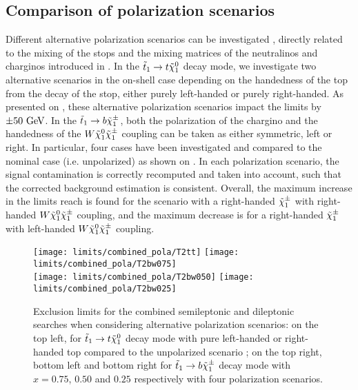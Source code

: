     \subsection{Comparison of polarization scenarios}

    Different alternative polarization scenarios can be investigated \cite{polarization1, polarization2}, directly related to the mixing of
    the stops and the mixing matrices of the neutralinos and charginos introduced in
    . In the
    $\tilde{t}_1 \rightarrow t \tilde{\chi}_1^0$ decay mode, we investigate two alternative scenarios
    in the on-shell case depending on the handedness of the top from the decay of the stop,
    either purely left-handed or purely right-handed. As presented on
    , these
    alternative polarization scenarios impact the limits by $\pm 50~\text{GeV}$. In the
    $\tilde{t}_1 \rightarrow b \tilde{\chi}_1^\pm$, both the polarization of the chargino and the
    handedness of the $W\tilde{\chi}_1^0\tilde{\chi}_1^\pm$ coupling can be taken as either symmetric,
    left or right. In particular, four cases have been investigated and compared to the
    nominal case (i.e. unpolarized) as shown on .
    In each polarization scenario, the signal contamination is correctly recomputed
    and taken into account, such that the corrected background estimation is consistent. Overall, the
    maximum increase in the limits reach is found for the scenario with a right-handed
    $\tilde{\chi}_1^\pm$ with right-handed $W\tilde{\chi}_1^0\tilde{\chi}_1^\pm$ coupling, and the maximum
    decrease is for a right-handed $\tilde{\chi}_1^\pm$ with left-handed $W\tilde{\chi}_1^0\tilde{\chi}_1^\pm$ coupling.

    \begin{figure}[h!]
        \centering
        \texttt{[image: limits/combined\_pola/T2tt]}
        \texttt{[image: limits/combined\_pola/T2bw075]}\\
        \texttt{[image: limits/combined\_pola/T2bw050]}
        \texttt{[image: limits/combined\_pola/T2bw025]}\\
        \caption{Exclusion limits for the combined semileptonic and dileptonic searches
        when considering alternative polarization scenarios: on the top left, for $\tilde{t}_1
        \rightarrow t \tilde{\chi}_1^0$ decay mode with pure left-handed or right-handed top
        compared to the unpolarized scenario ; on the top right, bottom left and bottom
        right for $\tilde{t}_1 \rightarrow b \tilde{\chi}_1^\pm$ decay mode with $x=0.75$, $0.50$ and
        $0.25$ respectively with four polarization scenarios.}
        \label{fig:resultsCombinedPolarized}
    \end{figure}

